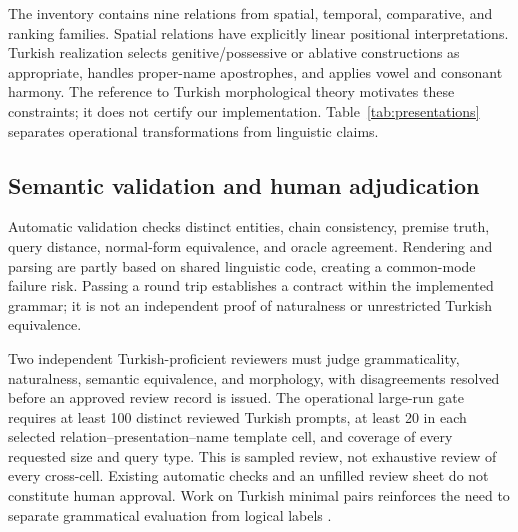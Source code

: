 The inventory contains nine relations from spatial, temporal, comparative, and ranking families. Spatial
relations have explicitly linear positional interpretations. Turkish realization selects
genitive/possessive or ablative constructions as appropriate, handles proper-name apostrophes, and applies
vowel and consonant harmony. The reference to Turkish morphological theory \citep{oflazer1994turkish}
motivates these constraints; it does not certify our implementation. Table~\ref{tab:presentations}
separates operational transformations from linguistic claims.

\subsection{Semantic validation and human adjudication}

Automatic validation checks distinct entities, chain consistency, premise truth, query distance,
normal-form equivalence, and oracle agreement. Rendering and parsing are partly based on shared linguistic
code, creating a common-mode failure risk. Passing a round trip establishes a contract within the
implemented grammar; it is not an independent proof of naturalness or unrestricted Turkish equivalence.

Two independent Turkish-proficient reviewers must judge grammaticality, naturalness, semantic equivalence,
and morphology, with disagreements resolved before an approved review record is issued. The operational
large-run gate requires at least 100 distinct reviewed Turkish prompts, at least 20 in each selected
relation--presentation--name template cell, and coverage of every requested size and query type. This is
sampled review, not exhaustive review of every cross-cell. Existing automatic checks and an unfilled review
sheet do not constitute human approval. Work on Turkish minimal pairs reinforces the need to separate
grammatical evaluation from logical labels \citep{basar2025turblimp, basar2026morphologyaware}.

